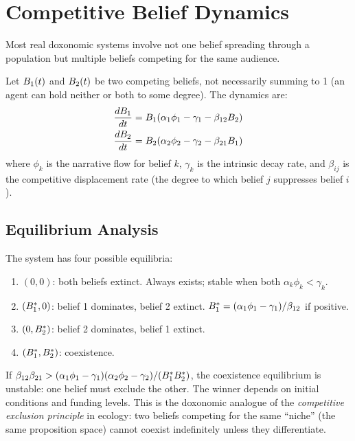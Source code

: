 \section{Competitive Belief Dynamics}
\label{sec:ch11-competitive}

Most real doxonomic systems involve not one belief spreading through a population but multiple beliefs competing for the same audience.

\begin{model}
\label{mod:lotka-volterra}
Let $B_{1}(t)$ and $B_{2}(t)$ be two competing beliefs, not necessarily summing to 1 (an agent can hold neither or both to some degree).
The dynamics are:
\begin{align}
  \frac{dB_{1}}{dt} &= B_{1}(\alpha_1 \phi_1 - \gamma_1 - \beta_{12}B_{2}) \label{eq:lv1}\\
  \frac{dB_{2}}{dt} &= B_{2}(\alpha_2 \phi_2 - \gamma_2 - \beta_{21}B_{1}) \label{eq:lv2}
\end{align}
where $\phi_k$ is the narrative flow for belief $k$, $\gamma_k$ is the intrinsic decay rate, and $\beta_{ij}$ is the competitive displacement rate (the degree to which belief $j$ suppresses belief $i$).
\end{model}

\subsection{Equilibrium Analysis}

The system has four possible equilibria:
\begin{enumerate}[nosep]
  \item $(0, 0)$: both beliefs extinct.
  Always exists; stable when both $\alpha_k\phi_k < \gamma_k$.
  \item $(B_{1}^*, 0)$: belief 1 dominates, belief 2 extinct.
  $B_{1}^* = (\alpha_1\phi_1 - \gamma_1)/\beta_{12}$ if positive.
  \item $(0, B_{2}^*)$: belief 2 dominates, belief 1 extinct.
  \item $(B_{1}^*, B_{2}^*)$: coexistence.
\end{enumerate}

\begin{proposition}
\label{prop:competitive-exclusion}
If $\beta_{12}\beta_{21} > (\alpha_1\phi_1 - \gamma_1)(\alpha_2\phi_2 - \gamma_2) / (B_{1}^*B_{2}^*)$, the coexistence equilibrium is unstable: one belief must exclude the other.
The winner depends on initial conditions and funding levels.
This is the doxonomic analogue of the \emph{competitive exclusion principle} in ecology: two beliefs competing for the same ``niche'' (the same proposition space) cannot coexist indefinitely unless they differentiate.
\end{proposition}

